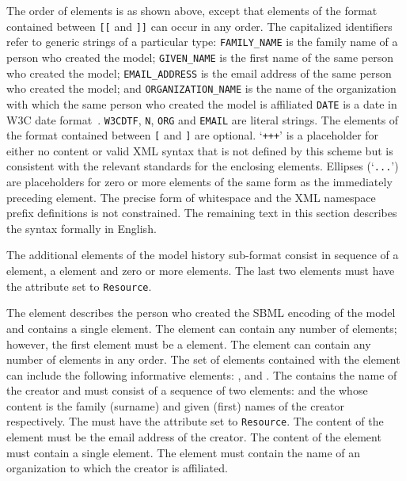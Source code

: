 The order of elements is as shown above, except that elements of
the format contained between \texttt{[[} and \texttt{]]} can occur
in any order.  The capitalized identifiers refer to generic
strings of a particular type: \texttt{FAMILY\_NAME} is the family
name of a person who created the model; \texttt{GIVEN\_NAME} is
the first name of the same person who created the model;
\texttt{EMAIL\_ADDRESS} is the email address of the same person
who created the model; and \texttt{ORGANIZATION\_NAME} is the name
of the organization with which the same person who created the
model is affiliated \texttt{DATE} is a date in W3C date
format~\citep{wolf:1998}. \texttt{W3CDTF}, \texttt{N},
\texttt{ORG} and \texttt{EMAIL} are literal strings. The elements
of the format contained between \texttt{[} and \texttt{]} are
optional. `\texttt{+++}' is a placeholder for either no content or
valid XML syntax that is not defined by this scheme but is
consistent with the relevant standards for the enclosing elements.
Ellipses (`\texttt{...}') are placeholders for zero or more
elements of the same form as the immediately preceding element.
The precise form of whitespace and the XML namespace prefix
definitions is not constrained.  The remaining text in this
section describes the syntax formally in English.

The additional elements of the model history sub-format consist in
sequence of a  element, a
 element and zero or more
 elements.  The last two elements must have
the attribute  set to \texttt{Resource}.

The  element describes the person who created
the SBML encoding of the model and contains a single
 element.  The  element can contain
any number of elements; however, the first element must be a
 element.  The  element can contain
any number of elements in any order.  The set of elements
contained with the  element can include the
following informative elements: ,
 and .  The 
contains the name of the creator and must consist of a sequence of
two elements:  and the 
whose content is the family (surname) and given (first) names of
the creator respectively.  The  must have the
attribute  set to \texttt{Resource}.  The
content of the  element must be the email
address of the creator.  The content of the 
element must contain a single  element.  The
 element must contain the name of an
organization to which the creator is affiliated.

